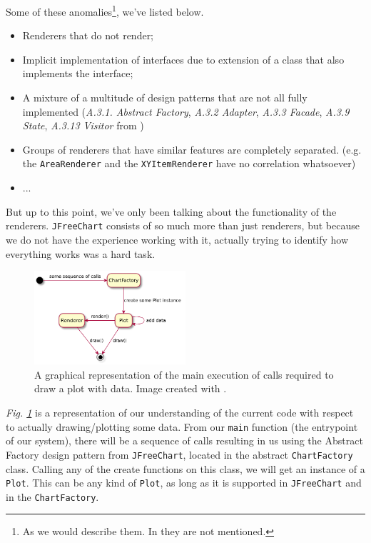 \documentclass[11pt]{article}
\begin{document}
	Some of these anomalies\footnote{As we would describe them. In \cite{demeyer2009object} they are not mentioned.}, we've listed below.
	\begin{itemize}
		\item Renderers that do not render;
		\item Implicit implementation of interfaces due to extension of a class that also implements the interface;
		\item A mixture of a multitude of design patterns that are not all fully implemented (\textsl{A.3.1. Abstract Factory}, \textsl{A.3.2 Adapter}, \textsl{A.3.3 Facade}, \textsl{A.3.9 State}, \textsl{A.3.13 Visitor} from \cite{demeyer2009object})
		\item Groups of renderers that have similar features are completely separated. (e.g. the \texttt{AreaRenderer} and the \texttt{XYItemRenderer} have no correlation whatsoever)
		\item ...
	\end{itemize}

	But up to this point, we've only been talking about the functionality of the renderers. \texttt{JFreeChart} consists of so much more than just renderers, but because we do not have the experience working with it, actually trying to identify how everything works was a hard task.
	
	\begin{figure}[H]
		\centering
		\includegraphics[width=0.5\textwidth]{pictures/draw-seq.pdf}
		\caption{A graphical representation of the main execution of calls required to draw a plot with data. Image created with \cite{plantuml}.}
		\label{fig:draw-seq}
	\end{figure}

	\textsl{Fig. \ref{fig:draw-seq}} is a representation of our understanding of the current code with respect to actually drawing/plotting some data. From our \texttt{main} function (the entrypoint of our system), there will be a sequence of calls resulting in us using the \textsf{Abstract Factory} design pattern from \texttt{JFreeChart}, located in the abstract \texttt{ChartFactory} class. Calling any of the create functions on this class, we will get an instance of a \texttt{Plot}. This can be any kind of \texttt{Plot}, as long as it is supported in \texttt{JFreeChart} and in the \texttt{ChartFactory}.
	
\end{document}
